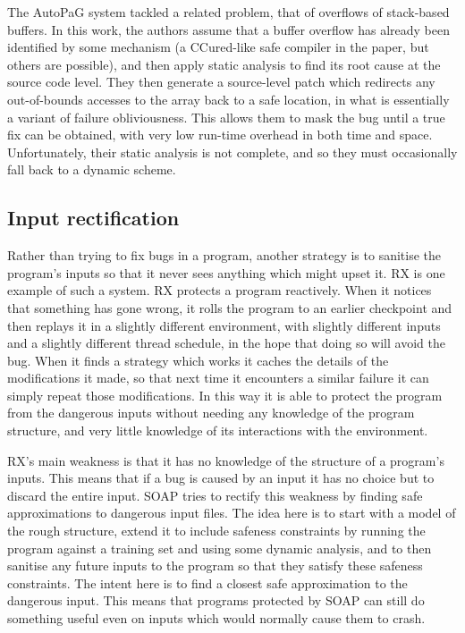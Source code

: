 
The AutoPaG system\cite{Lin2007} tackled a related problem, that of
overflows of stack-based buffers.  In this work, the authors assume
that a buffer overflow has already been identified by some mechanism
(a CCured\cite{Necula2005}-like safe compiler in the paper, but others
are possible), and then apply static analysis to find its root cause
at the source code level.  They then generate a source-level patch
which redirects any out-of-bounds accesses to the array back to a safe
location, in what is essentially a variant of failure obliviousness.
This allows them to mask the bug until a true fix can be obtained,
with very low run-time overhead in both time and space.
Unfortunately, their static analysis is not complete, and so they
must occasionally fall back to a dynamic scheme.

\subsection{Input rectification}

Rather than trying to fix bugs in a program, another strategy is to
sanitise the program's inputs so that it never sees anything which
might upset it.  RX\cite{Qin2007} is one example of such a system.  RX
protects a program reactively.  When it notices that something has
gone wrong, it rolls the program to an earlier checkpoint and then
replays it in a slightly different environment, with slightly
different inputs and a slightly different thread schedule, in the hope
that doing so will avoid the bug.  When it finds a strategy which
works it caches the details of the modifications it made, so that next
time it encounters a similar failure it can simply repeat those
modifications.  In this way it is able to protect the program from the
dangerous inputs without needing any knowledge of the program
structure, and very little knowledge of its interactions with the
environment.

RX's main weakness is that it has no knowledge of the structure of a
program's inputs.  This means that if a bug is caused by an input it
has no choice but to discard the entire input.  SOAP\cite{Long2012}
tries to rectify this weakness by finding safe approximations to
dangerous input files.  The idea here is to start with a model of the
rough structure, extend it to include safeness constraints by running
the program against a training set and using some dynamic analysis,
and to then sanitise any future inputs to the program so that they
satisfy these safeness constraints.  The intent here is to find a
closest safe approximation to the dangerous input.  This means that
programs protected by SOAP can still do something useful even on
inputs which would normally cause them to crash.

